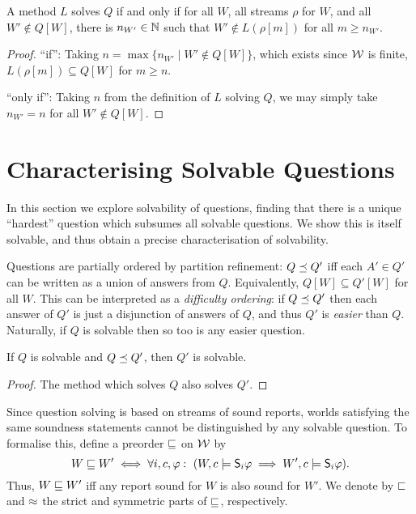 \begin{proposition}
    \label{tt_prop_elimination_solving}
    A method $L$ solves $Q$ if and only if for all $W$, all streams $\rho$ for
    $W$, and all $W' \notin Q[W]$, there is $n_{W'} \in \mathbb{N}$ such that $W'
    \notin L(\rho[m])$ for all $m \ge n_{W'}$.
\end{proposition}

\begin{proof}
    ``if'': Taking $n = \max\{n_{W'} \mid W' \notin Q[W]\}$, which exists
    since $\mathcal{W}$ is finite, $L(\rho[m]) \subseteq Q[W]$ for $m \ge
    n$.

    ``only if'': Taking $n$ from the definition of $L$ solving $Q$, we may
    simply take $n_{W'} = n$ for all $W' \notin Q[W]$.
\end{proof}

\section{Characterising Solvable Questions}
\label{tt_sec_characterising_solvable_questions}

In this section we explore solvability of questions, finding that there is a
unique ``hardest'' question which subsumes all solvable questions. We show this
is itself solvable, and thus obtain a precise characterisation of solvability.

Questions are partially ordered by partition refinement: $Q \preceq Q'$ iff
each $A' \in Q'$ can be written as a union of answers from $Q$. Equivalently,
$Q[W] \subseteq Q'[W]$ for all $W$. This can be interpreted as a
\emph{difficulty ordering}: if $Q \preceq Q'$ then each answer of $Q'$ is just
a disjunction of answers of $Q$, and thus $Q'$ is \emph{easier} than $Q$.
Naturally, if $Q$ is solvable then so too is any easier question.

\begin{proposition}
    \label{tt_prop_easier_questions_also_solvable}
    If $Q$ is solvable and $Q \preceq Q'$, then $Q'$ is solvable.
\end{proposition}
\begin{proof}
    The method which solves $Q$ also solves $Q'$.
\end{proof}

Since question solving is based on streams of sound reports, worlds satisfying
the same soundness statements cannot be distinguished by any solvable question.
To formalise this, define a preorder $\sqsubseteq$ on $\mathcal{W}$ by
\[
    W \sqsubseteq W'
    \iff
    \forall i, c, \varphi:\
        (W, c \models \mathsf{S}_i\varphi \implies W', c \models \mathsf{S}_i\varphi).
\]
Thus, $W \sqsubseteq W'$ iff any report sound for $W$ is also sound for $W'$. We
denote by $\sqsubset$ and $\approx$ the strict and symmetric parts of $\sqsubseteq$,
respectively.\footnotemark{}

